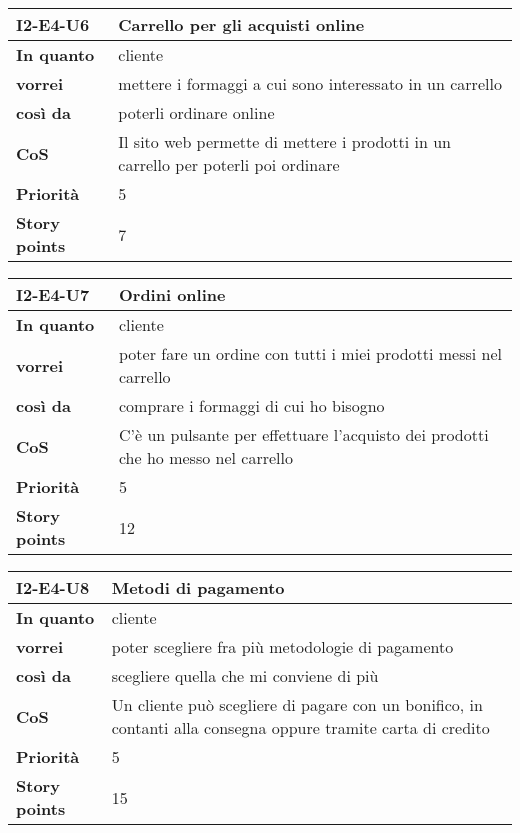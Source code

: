 \begin{table}[H]
  \begin{tabularx}{\textwidth}{lX}
    \toprule
    \textbf{I2-E4-U6} & \textbf{Carrello per gli acquisti online} \\
    \midrule
    \textbf{In quanto} & cliente \\
    \textbf{vorrei} & mettere i formaggi a cui sono interessato in un carrello \\
    \textbf{così da} & poterli ordinare online \\
    \midrule
    \textbf{CoS} & Il sito web permette di mettere i prodotti in un carrello per poterli poi ordinare \\
    \midrule
    \textbf{Priorità} & 5 \\
    \textbf{Story points} & 7 \\
    \bottomrule
  \end{tabularx}
  \label{user-story:i2-e4-u6}
\end{table}

\begin{table}[H]
  \begin{tabularx}{\textwidth}{lX}
    \toprule
    \textbf{I2-E4-U7} & \textbf{Ordini online} \\
    \midrule
    \textbf{In quanto} & cliente \\
    \textbf{vorrei} & poter fare un ordine con tutti i miei prodotti messi nel carrello \\
    \textbf{così da} & comprare i formaggi di cui ho bisogno \\
    \midrule
    \textbf{CoS} & C'è un pulsante per effettuare l'acquisto dei prodotti che ho messo nel carrello \\
    \midrule
    \textbf{Priorità} & 5 \\
    \textbf{Story points} & 12 \\
    \bottomrule
  \end{tabularx}
  \label{user-story:i2-e4-u7}
\end{table}

\begin{table}[H]
  \begin{tabularx}{\textwidth}{lX}
    \toprule
    \textbf{I2-E4-U8} & \textbf{Metodi di pagamento} \\
    \midrule
    \textbf{In quanto} & cliente \\
    \textbf{vorrei} & poter scegliere fra più metodologie di pagamento \\
    \textbf{così da} & scegliere quella che mi conviene di più \\
    \midrule
    \textbf{CoS} & Un cliente può scegliere di pagare con un bonifico, in contanti alla consegna oppure tramite carta di credito \\
    \midrule
    \textbf{Priorità} & 5 \\
    \textbf{Story points} & 15 \\
    \bottomrule
  \end{tabularx}
  \label{user-story:i2-e4-u8}
\end{table}

